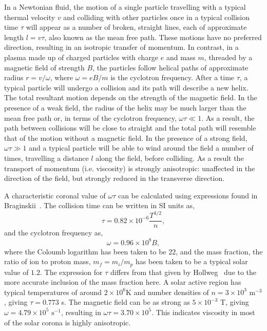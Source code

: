\label{sec:visc_in_magnetised_plasma}

In a Newtonian fluid, the motion of a single particle travelling with a typical thermal velocity $v$ and colliding with other particles once in a typical collision time $\tau$ will appear as a number of broken, straight lines, each of approximate length $l = v\tau$, also known as the mean free path. These motions have no preferred direction, resulting in an isotropic transfer of momentum. In contrast, in a plasma made up of charged particles with charge $e$ and mass $m$, threaded by a magnetic field of strength $B$, the particles follow helical paths of approximate radius $r = v/\omega$, where $\omega = eB/m$ is the cyclotron frequency. After a time $\tau$, a typical particle will undergo a collision and its path will describe a new helix. The total resultant motion depends on the strength of the magnetic field. In the presence of a weak field, the radius of the helix may be much larger than the mean free path or, in terms of the cyclotron frequency, $\omega \tau \ll 1$. As a result, the path between collisions will be close to straight and the total path will resemble that of the motion without a magnetic field. In the presence of a strong field, $\omega \tau \gg 1$ and a typical particle will be able to wind around the field a number of times, travelling a distance $l$ along the field, before colliding. As a result the transport of momentum (i.e. viscosity) is strongly anisotropic: unaffected in the direction of the field, but strongly reduced in the transverse direction.

A characteristic coronal value of $\omega \tau$ can be calculated using expressions found in Braginskii~\cite{braginskiiTransportProcessesPlasma1965}. The collision time can be written in SI units as,
\begin{equation}
  \label{eq:collision_time}
  \tau = 0.82 \times 10^{-6} \frac{T^{3/2}}{n},
\end{equation}
and the cyclotron frequency as,
\begin{equation}
  \label{eq:cyclotron_frequency}
  \omega = 0.96\times10^8 B,
\end{equation}
where the Coloumb logarithm has been taken to be 22, and the mass fraction, the ratio of ion to proton mass, $m_f = m_i/m_p$ has been taken to be a typical solar value of $1.2$. The expression for $\tau$ differs from that given by Hollweg~\cite{hollwegViscosityMagnetizedPlasma1985} due to the more accurate inclusion of the mass fraction here. A solar active region has typical temperatures of around $2\times 10^6$K and number densities of $n = 3 \times 10^3\text{ m}^{-3}$, giving $\tau = 0.773$ s. The magnetic field can be as strong as $5\times 10^{-3}$ T, giving $\omega = 4.79 \times 10^5 \text{ s}^{-1}$, resulting in $\omega \tau = 3.70 \times 10^5$. This indicates viscosity in most of the solar corona is highly anisotropic.

